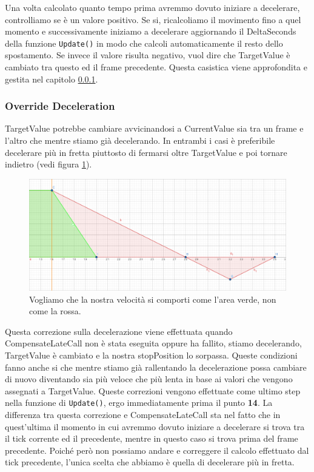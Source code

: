 \documentclass[main.tex]{subfiles}
\begin{document}
\noindent Una volta calcolato quanto tempo prima avremmo dovuto iniziare a decelerare, controlliamo se è un valore positivo. Se si, ricalcoliamo il movimento fino a quel momento e successivamente iniziamo a decelerare aggiornando il DeltaSeconds della funzione \lstinline{Update()} in modo che calcoli automaticamente il resto dello spostamento. \newline
Se invece il valore risulta negativo, vuol dire che TargetValue è cambiato tra questo ed il frame precedente. Questa casistica viene approfondita e gestita nel capitolo  \ref{subsubsec:4_2_OverrideDeceleration}.


\subsubsection{Override Deceleration}\label{subsubsec:4_2_OverrideDeceleration}
TargetValue potrebbe cambiare avvicinandosi a CurrentValue sia tra un frame e l'altro che mentre stiamo già decelerando. In entrambi i casi è preferibile decelerare più in fretta piuttosto di fermarsi oltre TargetValue e poi tornare indietro (vedi figura \ref{fig:4_OverrideDecelIntro}).
\begin{figure}[H]
    \centering
    \includegraphics[width=.95\linewidth]{img/interpolazione/OverrideDecelIntro.png}
    \caption{Vogliamo che la nostra velocità si comporti come l'area verde, non come la rossa.}
    \label{fig:4_OverrideDecelIntro}
\end{figure}
\noindent Questa correzione sulla decelerazione viene effettuata quando CompensateLateCall non è stata eseguita oppure ha fallito, stiamo decelerando, TargetValue è cambiato e la nostra stopPosition lo sorpassa. Queste condizioni fanno anche si che mentre stiamo già rallentando la decelerazione possa cambiare di nuovo diventando sia più veloce che più lenta in base ai valori che vengono assegnati a TargetValue. Queste correzioni vengono effettuate come ultimo step nella funzione di \lstinline{Update()}, ergo immediatamente prima il punto \textbf{14}. \newline
La differenza tra questa correzione e CompensateLateCall sta nel fatto che in quest'ultima il momento in cui avremmo dovuto iniziare a decelerare si trova tra il tick corrente ed il precedente, mentre in questo caso si trova prima del frame precedente. Poiché però non possiamo andare  e correggere il calcolo effettuato dal tick precedente, l'unica scelta che abbiamo è quella di decelerare più in fretta.\newline
\end{document}
